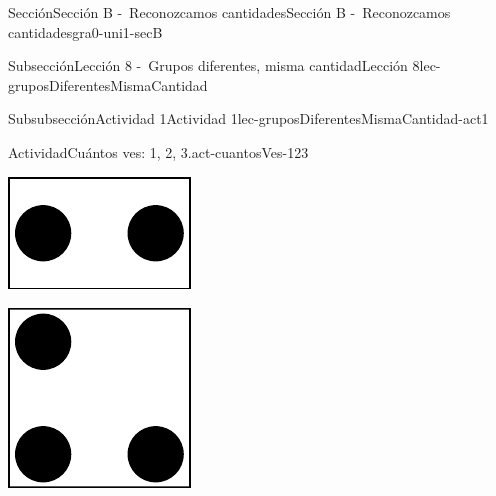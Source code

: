 \documentclass[twoside,10pt,]{article}
\begin{document}
\begin{sectionptx}{Sección}{Sección B -~Reconozcamos cantidades}{}{Sección B -~Reconozcamos cantidades}{}{}{gra0-uni1-secB}
\begin{subsectionptx}{Subsección}{Lección 8 -~Grupos diferentes, misma cantidad}{}{Lección 8}{}{}{lec-gruposDiferentesMismaCantidad}
\begin{subsubsectionptx}{Subsubsección}{Actividad 1}{}{Actividad 1}{}{}{lec-gruposDiferentesMismaCantidad-act1}
\begin{activity}{Actividad}{Cuántos ves: 1, 2, 3.}{act-cuantosVes-123}
\begin{sidebyside}{3}{0.0416666666666667}{0.0416666666666667}{0.0833333333333333}
\begin{sbspanel}{0.25}
\includegraphics[width=\linewidth]{external/svg-source/tikz-file-136323.pdf}
\end{sbspanel}%
\begin{sbspanel}{0.25}%
\includegraphics[width=\linewidth]{external/svg-source/tikz-file-136324.pdf}
\end{sbspanel}%
\end{sidebyside}%
\end{activity}%
\end{subsubsectionptx}
%
%
\typeout{************************************************}
\typeout{************************************************}

\end{subsectionptx}
\end{sectionptx}
\end{document}
